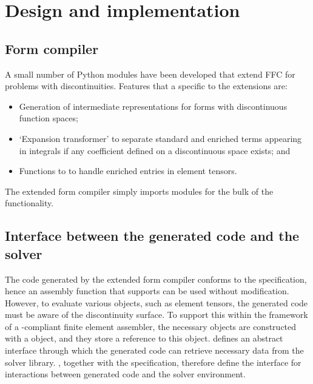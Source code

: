 \section{Design and implementation}
\subsection{Form compiler}

A small number of Python modules have been developed that extend FFC
for problems with discontinuities. Features that a specific to the
extensions are:
%
\begin{itemize}
  \item Generation of intermediate representations for forms with
  discontinuous function spaces;

  \item `Expansion transformer' to separate standard and enriched terms
  appearing in integrals if any coefficient defined on a discontinuous
  space exists; and

  \item Functions to to handle enriched entries in element tensors.
\end{itemize}
%
The extended form compiler simply imports \ffc{} modules for the
bulk of the functionality.
\subsection{Interface between the generated code and the solver}

The code generated by the extended form compiler conforms to the
\ufc{} specification, hence an assembly function that supports \ufc{}
can be used without modification.  However, to evaluate various
objects, such as element tensors, the generated code must be aware
of the discontinuity surface. To support this within the framework
of a \ufc{}-compliant finite element assembler, the necessary \ufc{}
objects are constructed with a  object, and they store a
reference to this object.   defines an abstract interface
through which the generated code can retrieve necessary data from the
solver library. , together with the \ufc{} specification,
therefore define the interface for interactions between generated code
and the solver environment.

